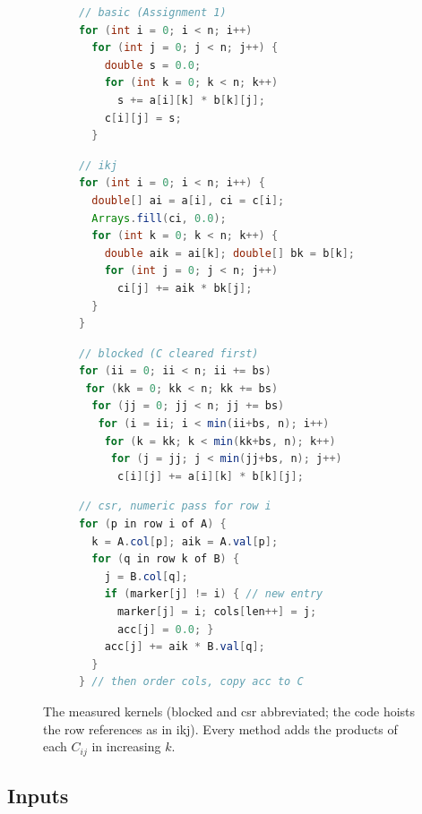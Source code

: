 \documentclass[11pt,a4paper]{article}
\begin{document}
\begin{figure}[t]
\centering
\begin{subfigure}[t]{0.48\linewidth}
\begin{lstlisting}[language=Java]
// basic (Assignment 1)
for (int i = 0; i < n; i++)
  for (int j = 0; j < n; j++) {
    double s = 0.0;
    for (int k = 0; k < n; k++)
      s += a[i][k] * b[k][j];
    c[i][j] = s;
  }
\end{lstlisting}
\end{subfigure}\hfill
\begin{subfigure}[t]{0.48\linewidth}
\begin{lstlisting}[language=Java]
// ikj
for (int i = 0; i < n; i++) {
  double[] ai = a[i], ci = c[i];
  Arrays.fill(ci, 0.0);
  for (int k = 0; k < n; k++) {
    double aik = ai[k]; double[] bk = b[k];
    for (int j = 0; j < n; j++)
      ci[j] += aik * bk[j];
  }
}
\end{lstlisting}
\end{subfigure}

\medskip
\begin{subfigure}[t]{0.48\linewidth}
\begin{lstlisting}[language=Java]
// blocked (C cleared first)
for (ii = 0; ii < n; ii += bs)
 for (kk = 0; kk < n; kk += bs)
  for (jj = 0; jj < n; jj += bs)
   for (i = ii; i < min(ii+bs, n); i++)
    for (k = kk; k < min(kk+bs, n); k++)
     for (j = jj; j < min(jj+bs, n); j++)
      c[i][j] += a[i][k] * b[k][j];
\end{lstlisting}
\end{subfigure}\hfill
\begin{subfigure}[t]{0.48\linewidth}
\begin{lstlisting}[language=Java]
// csr, numeric pass for row i
for (p in row i of A) {
  k = A.col[p]; aik = A.val[p];
  for (q in row k of B) {
    j = B.col[q];
    if (marker[j] != i) { // new entry
      marker[j] = i; cols[len++] = j;
      acc[j] = 0.0; }
    acc[j] += aik * B.val[q];
  }
} // then order cols, copy acc to C
\end{lstlisting}
\end{subfigure}
\caption{The measured kernels (blocked and csr abbreviated; the code hoists the
row references as in ikj). Every method adds the products of each $C_{ij}$ in
increasing $k$.}
\label{fig:kernels}
\end{figure}

\subsection{Inputs}
\end{document}

